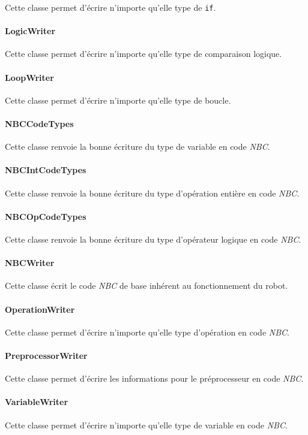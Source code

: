 Cette classe permet d'écrire n'importe qu'elle type de \texttt{if}.

\paragraph{LogicWriter}

Cette classe permet d'écrire n'importe qu'elle type de comparaison logique.

\paragraph{LoopWriter}

Cette classe permet d'écrire n'importe qu'elle type de boucle.

\paragraph{NBCCodeTypes}

Cette classe renvoie la bonne écriture du type de variable en code \emph{NBC}.

\paragraph{NBCIntCodeTypes}

Cette classe renvoie la bonne écriture du type d'opération entière en code \emph{NBC}.

\paragraph{NBCOpCodeTypes}

Cette classe renvoie la bonne écriture du type d'opérateur logique en code \emph{NBC}.

\paragraph{NBCWriter}

Cette classe écrit le code \emph{NBC} de base inhérent au fonctionnement du robot.

\paragraph{OperationWriter}

Cette classe permet d'écrire n'importe qu'elle type d'opération en code \emph{NBC}.

\paragraph{PreprocessorWriter}

Cette classe permet d'écrire les informations pour le préprocesseur en code \emph{NBC}.

\paragraph{VariableWriter}

Cette classe permet d'écrire n'importe qu'elle type de variable en code \emph{NBC}.